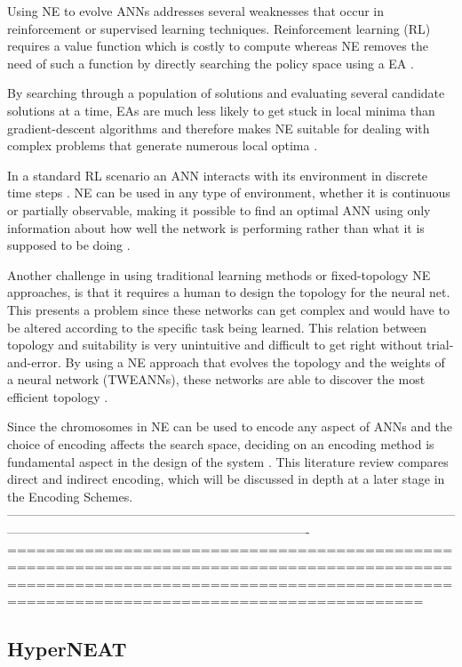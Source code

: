 \documentclass[conference]{IEEEtran}
\begin{document}
Using NE to evolve ANNs addresses several weaknesses that occur in reinforcement or supervised learning techniques. Reinforcement learning (RL) requires a value function which is costly to compute whereas NE removes the need of such a function by directly searching the policy space using a EA \cite{RefWorks:32}. 

By searching through a population of solutions and evaluating several candidate solutions at a time, EAs are much less likely to get stuck in local minima than gradient-descent algorithms and therefore makes NE suitable for dealing with complex problems that generate numerous local optima \cite{gomez2001neuro,RefWorks:1}.

In a standard RL scenario an ANN interacts with its environment in discrete time steps \cite{igel2003neuroevolution}. NE can be used in any type of environment, whether it is continuous or partially observable, making it possible to find an optimal ANN using only information about how well the network is performing rather than what it is supposed to be doing \cite{Miikkulainen:2010:ENN:1830761.1830902}. 

Another challenge in using traditional learning methods or fixed-topology NE approaches, is that it requires a human to design the topology for the neural net. This presents a problem since these networks can get complex and would have to be altered according to the specific task being learned. This relation between topology and suitability is very unintuitive and difficult to get right without trial-and-error. By using a NE approach that evolves the topology and the weights of a neural network (TWEANNs), these networks are able to discover the most efficient topology \cite{RefWorks:31}.

Since the chromosomes in NE can be used to encode any aspect of ANNs and the choice of encoding affects the search space, deciding on an encoding method is fundamental aspect in the design of the system \cite{RefWorks:31}. This literature review compares direct and indirect encoding, which will be discussed in depth at a later stage in the Encoding Schemes.
-------------------------------------------------------------------------------------------------------------------------------------------------------------------------------------
=====================================================================================================================================================================================


\subsection{HyperNEAT}
\end{document}
